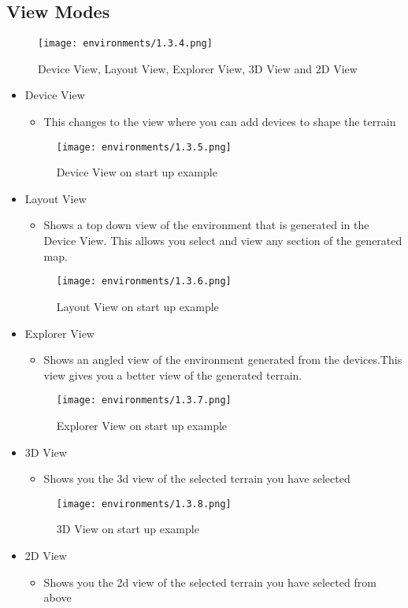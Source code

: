 \documentclass[../main.tex]{subfiles}
\begin{document}
\subsection{View Modes}
\begin{figure}[H]
\texttt{[image: environments/1.3.4.png]}
\caption{Device View, Layout View, Explorer View, 3D View and 2D View}
\end{figure}
\begin{itemize}
    \item Device View
    \begin{itemize}
        \item This changes to the view where you can add devices to shape the terrain
    \end{itemize}
    \begin{figure}[H]
    \texttt{[image: environments/1.3.5.png]}
    \caption{Device View on start up example}
    \end{figure}
    \item Layout View
    \begin{itemize}
        \item Shows a top down view of the environment that is generated in the Device View. This allows you select and view any section of the generated map.
    \end{itemize}
    \begin{figure}[H]
    \texttt{[image: environments/1.3.6.png]}
    \caption{Layout View on start up example}
    \end{figure}
    \item Explorer View
    \begin{itemize}
        \item Shows an angled view of the environment generated from the devices.This view gives you a better view of the generated terrain.
    \end{itemize}
    \begin{figure}[H]
    \texttt{[image: environments/1.3.7.png]}
    \caption{Explorer View on start up example}
    \end{figure}
    \item 3D View
    \begin{itemize}
        \item Shows you the 3d view of the selected terrain you have selected
    \end{itemize}
    \begin{figure}[H]
    \texttt{[image: environments/1.3.8.png]}
    \caption{3D View on start up example}
    \end{figure}
    \item 2D View
    \begin{itemize}
        \item Shows you the 2d view of the selected terrain you have selected from above
    \end{itemize}
\end{itemize}
\end{document}
